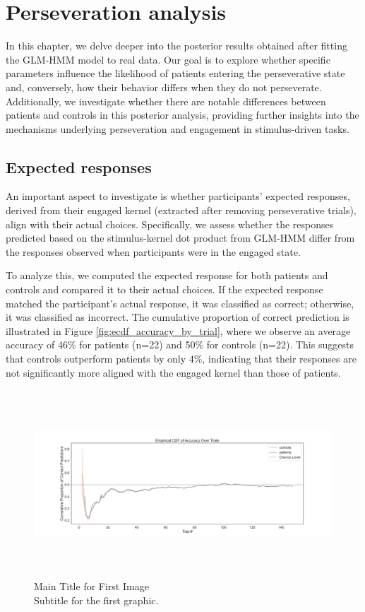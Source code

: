 \renewcommand{\chaptername}{Chapter} 
\chapter{Perseveration analysis}\label{chap9}
In this chapter, we delve deeper into the posterior results obtained after fitting the GLM-HMM model to real data. Our goal is to explore whether specific parameters influence the likelihood of patients entering the perseverative state and, conversely, how their behavior differs when they do not perseverate. Additionally, we investigate whether there are notable differences between patients and controls in this posterior analysis, providing further insights into the mechanisms underlying perseveration and engagement in stimulus-driven tasks.
\section{Expected responses} 
An important aspect to investigate is whether participants' expected responses, derived from their engaged kernel (extracted after removing perseverative trials), align with their actual choices. Specifically, we assess whether the responses predicted based on the stimulus-kernel dot product from GLM-HMM differ from the responses observed when participants were in the engaged state.

To analyze this, we computed the expected response for both patients and controls and compared it to their actual choices. If the expected response matched the participant’s actual response, it was classified as correct; otherwise, it was classified as incorrect. The cumulative proportion of correct prediction is illustrated in Figure \ref{fig:ecdf_accuracy_by_trial}, where we observe an average accuracy of 46\% for patients (n=22) and 50\% for controls (n=22). This suggests that controls outperform patients by only 4\%, indicating that their responses are not significantly more aligned with the engaged kernel than those of patients.
\begin{figure}[H]
    \centering
    \includegraphics[width=16cm,height=7cm]{MainLayout/Images/chapter9/ecdf_accuracy_by_trial.jpg}
    \caption{Main Title for First Image \\ \small Subtitle for the first graphic.}
    \label{fig:accuracy_by_trial}
\end{figure}

